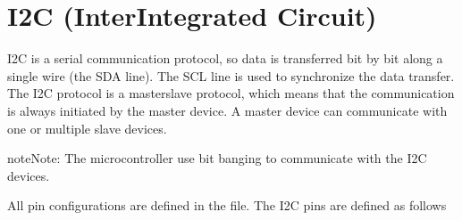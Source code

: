 \documentclass[letterpaper,10pt,english]{sphinxmanual}
\begin{document}
\begin{sphinxVerbatim}[commandchars=\\\{\}]

 


     
                 
\end{sphinxVerbatim}

\sphinxstepscope


\chapter{I2C (Inter\sphinxhyphen{}Integrated Circuit)}
\label{\detokenize{i2c:i2c-inter-integrated-circuit}}\label{\detokenize{i2c::doc}}
\sphinxAtStartPar
I2C is a serial communication protocol, so data is transferred bit by bit along a single wire (the SDA line). The SCL line is used to synchronize the data transfer. The I2C protocol is a master\sphinxhyphen{}slave protocol, which means that the communication is always initiated by the master device. A master device can communicate with one or multiple slave devices.

\begin{sphinxadmonition}{note}{Note:}
\sphinxAtStartPar
The microcontroller use bit banging to communicate with the I2C devices.
\end{sphinxadmonition}

\sphinxAtStartPar
All pin configurations are defined in the  file. The I2C pins are defined as follows
\end{document}
